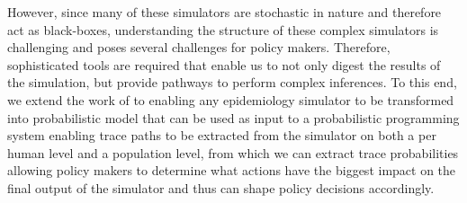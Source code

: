 \documentclass{article}
\begin{document}
However, since many of these simulators are stochastic in nature and therefore act as black-boxes, understanding the structure of these complex simulators is challenging and poses several challenges for policy makers. 
Therefore, sophisticated tools are required that enable us to not only digest the results of the simulation, but provide pathways to perform complex inferences. 
To this end, we extend the work of \citep{baydin2018efficient} to enabling any epidemiology simulator to be transformed into probabilistic model that can be used as input to a probabilistic programming system enabling trace paths to be extracted from the simulator on both a per human level and a population level, from which we can extract trace probabilities allowing policy makers to determine what actions have the biggest impact on the final output of the simulator and thus can shape policy decisions accordingly.





\end{document}
